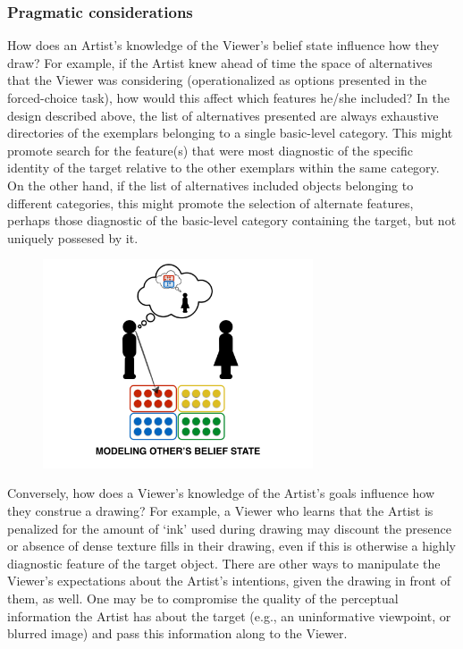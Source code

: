 \documentclass[12pt]{article}
\begin{document}
\subsubsection{Pragmatic considerations} How does an Artist's knowledge of the Viewer's belief state influence how they draw? For example, if the Artist knew ahead of time the space of alternatives that the Viewer was considering (operationalized as options presented in the forced-choice task), how would this affect which features he/she included? In the design described above, the list of alternatives presented are always exhaustive directories of the exemplars belonging to a single basic-level category. This might promote search for the feature(s) that were most diagnostic of the specific identity of the target relative to the other exemplars within the same category. On the other hand, if the list of alternatives included objects belonging to different categories, this might promote the selection of alternate features, perhaps those diagnostic of the basic-level category containing the target, but not uniquely possesed by it. 

\begin{figure}[hbtp]
\begin{center}
\includegraphics[width=80mm]{figures/pragmatic_considerations.pdf}
\end{center}
\end{figure}
\vspace{-5mm}

Conversely, how does a Viewer's knowledge of the Artist's goals influence how they construe a drawing? For example, a Viewer who learns that the Artist is penalized for the amount of `ink' used during drawing may discount the presence or absence of dense texture fills in their drawing, even if this is otherwise a highly diagnostic feature of the target object. There are other ways to manipulate the Viewer's expectations about the Artist's intentions, given the drawing in front of them, as well. One may be to compromise the quality of the perceptual information the Artist has about the target (e.g., an uninformative viewpoint, or blurred image) and pass this information along to the Viewer.
\end{document}
